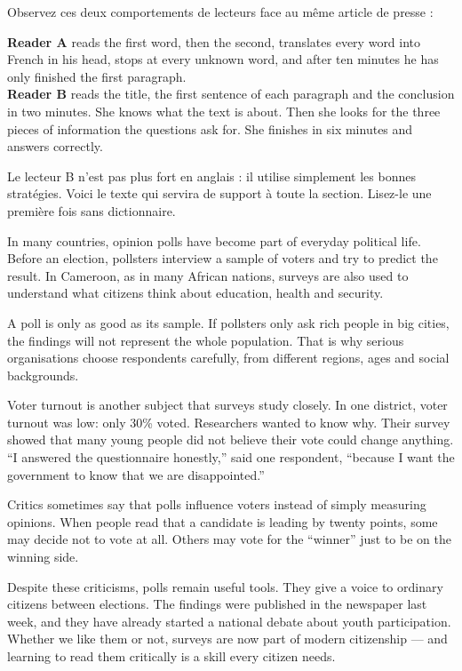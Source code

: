 \documentclass[11pt]{article}
\newcounter{popsec}
\newcounter{popsub}
\newcommand{\courssub}[1]{%
  \stepcounter{popsub}%
  \par\vspace{9pt}\noindent{\popxbold\fontsize{11.5}{13}\selectfont\color{popink}{\color{poporange}\thepopsec.\thepopsub}\hspace{6pt}#1}\par\nopagebreak\vspace{4pt}
}
\begin{document}
\courssub{Pourquoi des stratégies de lecture ?}

Observez ces deux comportements de lecteurs face au même article de presse :

\begin{exemplebox}
\textbf{Reader A} reads the first word, then the second, translates every word into French in his head, stops at every unknown word, and after ten minutes he has only finished the first paragraph.\\
\textbf{Reader B} reads the title, the first sentence of each paragraph and the conclusion in two minutes. She knows what the text is about. Then she looks for the three pieces of information the questions ask for. She finishes in six minutes and answers correctly.
\end{exemplebox}

Le lecteur B n'est pas plus fort en anglais : il utilise simplement les bonnes stratégies. Voici le texte qui servira de support à toute la section. Lisez-le une première fois sans dictionnaire.

\begin{textebox}
In many countries, opinion polls have become part of everyday political life. Before an election, pollsters interview a sample of voters and try to predict the result. In Cameroon, as in many African nations, surveys are also used to understand what citizens think about education, health and security.

A poll is only as good as its sample. If pollsters only ask rich people in big cities, the findings will not represent the whole population. That is why serious organisations choose respondents carefully, from different regions, ages and social backgrounds.

Voter turnout is another subject that surveys study closely. In one district, voter turnout was low: only 30\% voted. Researchers wanted to know why. Their survey showed that many young people did not believe their vote could change anything. “I answered the questionnaire honestly,” said one respondent, “because I want the government to know that we are disappointed.”

Critics sometimes say that polls influence voters instead of simply measuring opinions. When people read that a candidate is leading by twenty points, some may decide not to vote at all. Others may vote for the “winner” just to be on the winning side.

Despite these criticisms, polls remain useful tools. They give a voice to ordinary citizens between elections. The findings were published in the newspaper last week, and they have already started a national debate about youth participation. Whether we like them or not, surveys are now part of modern citizenship — and learning to read them critically is a skill every citizen needs.
\end{textebox}
\end{document}
